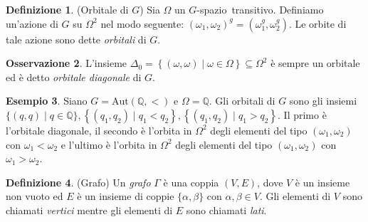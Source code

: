 \documentclass[12pt,a4paper,openright]{report}
\newcommand{\aut}{ \mathrm{Aut} ( \mathbb{Q},< ) } %
\newcommand{\Q}{\mathbb{Q}} %
\newcommand{\0}{\setminus\{0\}} %
\newcommand{\Gsp}{$G$-spazio~} %
\theoremstyle{definition}
\newtheorem{defn}{Definizione}[chapter]
\newtheorem{oss}[defn]{Osservazione}
\newtheorem{es}[defn]{Esempio}
\theoremstyle{plain}
\begin{document}
\begin{defn}(Orbitale di $G$)
Sia $\Omega$ un \Gsp transitivo. Definiamo un'azione di $G$ su $\Omega^2$ nel modo seguente: $(\omega_1,\omega_2)^g=(\omega_1^g,\omega_2^g)$. Le orbite di tale azione sono dette \emph{orbitali} di $G$.
\end{defn}
\begin{oss}
L'insieme $\Delta_0=\left\{(\omega,\omega) \mid \omega \in \Omega \right\} \subseteq \Omega^2$ è sempre un orbitale ed è detto \emph{orbitale diagonale} di $G$.
\end{oss}
\begin{es} \label{es:orbitaleq}
Siano $G=\aut$ e $\Omega=\Q$. Gli orbitali di $G$ sono gli insiemi $\{(q,q)\mid q \in \Q\}, \left\{(q_1,q_2)\mid q_1<q_2\right\},\left\{(q_1,q_2)\mid q_1>q_2\right\}$. 
Il primo è l'orbitale diagonale, il secondo è l'orbita in  $\Omega^2$ degli elementi del tipo $(\omega_1,\omega_2)$ con $\omega_1<\omega_2$ e l'ultimo è l'orbita in $\Omega^2$ degli elementi del tipo $(\omega_1,\omega_2)$ con $\omega_1>\omega_2$.
\end{es}
\begin{defn}(Grafo)
Un \emph{grafo} $\Gamma$ è una coppia $(V,E)$, dove $V$ è un insieme non vuoto ed $E$ è un insieme di coppie $\{\alpha,\beta \}$ con $\alpha,\beta \in V$. Gli elementi di $V$ sono chiamati \emph{vertici} mentre gli elementi di $E$ sono chiamati \emph{lati}.
\end{defn}
\end{document}
